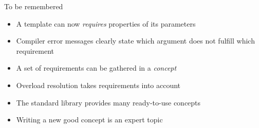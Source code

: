 \begin{frame}[fragile]
    \begin{block}{To be remembered}
      \begin{itemize}
      \item A template can now {\it requires} properties of its parameters
      \item Compiler error messages clearly state which argument does not fulfill which requirement
      \item A set of requirements can be gathered in a {\it concept}
      \item Overload resolution takes requirements into account
      \item The standard library provides many ready-to-use concepts
      \item Writing a new good concept is an expert topic
      \end{itemize}
    \end{block}
\end{frame}
